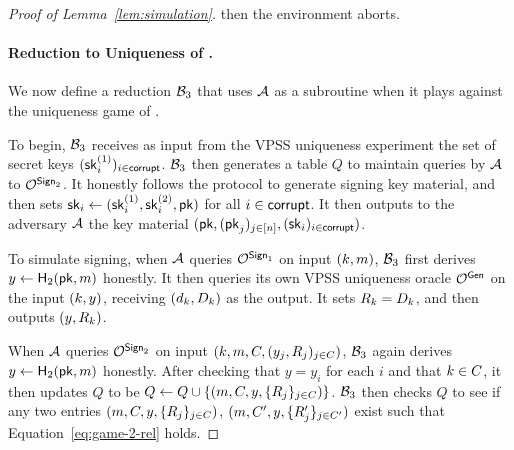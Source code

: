 \begin{proof}[Proof of Lemma~\ref{lem:simulation}]



  then the environment aborts.


  \paragraph{Reduction to Uniqueness of \DVRFOne.}
  We now define a reduction $\mathcal{B}_3$ that uses $\mathcal{A}$ as a subroutine when it plays against the uniqueness game of \DVRFOne.

  To begin,
  $\mathcal{B}_3$ receives as input from the VPSS uniqueness experiment the set of \DVRFOne secret keys $(\mathsf{sk}^{(1)}_i)_{i \in \mathsf{corrupt}}$.
  $\mathcal{B}_3$ then generates a table $Q$ to maintain queries by $\mathcal{A}$ to $\mathcal{O}^{\mathsf{Sign}_2}$.
  It honestly follows the protocol to generate signing key material,
  and then sets $\mathsf{sk}_i \gets (\mathsf{sk}^{(1)}_i, \mathsf{sk}^{(2)}_i, \mathsf{pk})$ for all $i \in \mathsf{corrupt}$.
  It then outputs to the adversary $\mathcal{A}$ the key material
  $(\mathsf{pk}, (\mathsf{pk}_j)_{j \in [n]}, (\mathsf{sk}_i)_{i \in \mathsf{corrupt}})$.

  To simulate signing,
  when $\mathcal{A}$ queries $\mathcal{O}^{\mathsf{Sign}_1}$ on input $(k, m)$,
  $\mathcal{B}_3$ first derives $y \gets \mathsf{H}_2(\mathsf{pk}, m)$ honestly.
  It then queries its own VPSS uniqueness oracle $\mathcal{O}^{\mathsf{Gen}}$ on the input $(k, y)$,
  receiving $(d_k, D_k)$ as the output.
  It sets $R_k = D_k$,
  and then outputs $(y, R_k)$.

  When $\mathcal{A}$ queries $\mathcal{O}^{\mathsf{Sign}_2}$ on input $(k, m, C, (y_j, R_j)_{j \in C})$,
  $\mathcal{B}_3$ again derives $y \gets \mathsf{H}_2(\mathsf{pk}, m)$ honestly.
  After checking that $y=y_i$ for each $i$ and that $k \in C$,
  it then updates $Q$ to be $Q \gets Q \cup \{ (m, C, y, \{ R_j\}_{j \in C}) \}$.
  $\mathcal{B}_3$ then checks $Q$ to see if any two entries
  $(m, C, y, \{ R_j\}_{j \in C})$, $(m, C', y, \{ R_j'\}_{j \in C'})$
  exist such that Equation~\ref{eq:game-2-rel} holds.


\end{proof}
